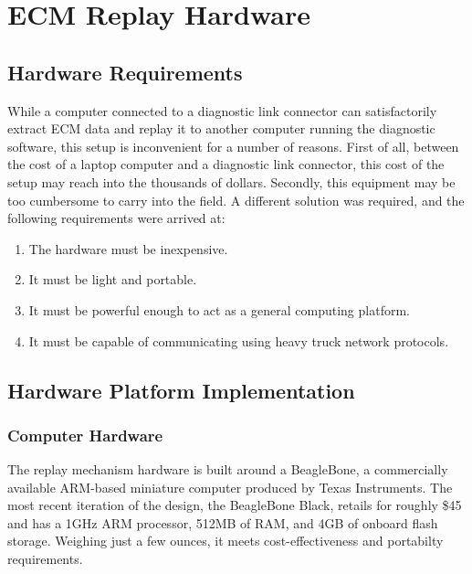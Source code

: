 \chapter{ECM Replay Hardware}


\section{Hardware Requirements}

While a computer connected to a diagnostic link connector can satisfactorily extract ECM data and replay
it to another computer running the diagnostic software, this setup is inconvenient for a number of reasons.
First of all, between the cost of a laptop computer and a diagnostic link connector, this cost of the setup
may reach into the thousands of dollars. Secondly, this equipment may be too cumbersome to carry into the field.
A different solution was required, and the following requirements were arrived at:

\begin{enumerate}
  \item The hardware must be inexpensive.
  \item It must be light and portable.
  \item It must be powerful enough to act as a general computing platform.
  \item It must be capable of communicating using heavy truck network protocols.
\end{enumerate}

\section{Hardware Platform Implementation}

\subsection{Computer Hardware}

The replay mechanism hardware is built around a BeagleBone, a commercially available ARM-based miniature computer produced
by Texas Instruments\cite{BeagleBone}. The most recent iteration of the design, the BeagleBone Black, retails for roughly \$45 and has a 1GHz ARM
processor, 512MB of RAM, and 4GB of onboard flash storage. Weighing just a few ounces, it meets cost-effectiveness and portabilty
requirements.

